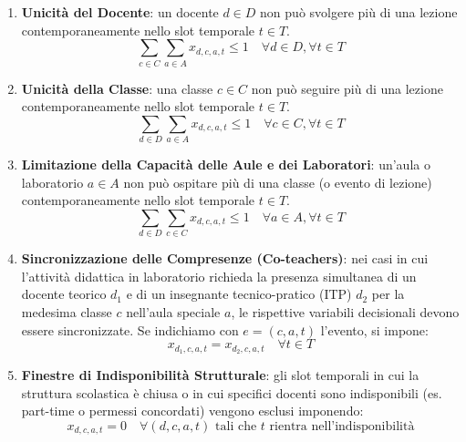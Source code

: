 \begin{enumerate}
    \item \textbf{Unicità del Docente}: un docente $d \in D$ non può svolgere più di una lezione contemporaneamente nello slot temporale $t \in T$.
    \begin{equation}
    \sum_{c \in C} \sum_{a \in A} x_{d,c,a,t} \le 1 \quad \forall d \in D, \forall t \in T
    \label{eq:unicita-docente}
    \end{equation}

    \item \textbf{Unicità della Classe}: una classe $c \in C$ non può seguire più di una lezione contemporaneamente nello slot temporale $t \in T$.
    \begin{equation}
    \sum_{d \in D} \sum_{a \in A} x_{d,c,a,t} \le 1 \quad \forall c \in C, \forall t \in T
    \label{eq:unicita-classe}
    \end{equation}

    \item \textbf{Limitazione della Capacità delle Aule e dei Laboratori}: un'aula o laboratorio $a \in A$ non può ospitare più di una classe (o evento di lezione) contemporaneamente nello slot temporale $t \in T$.
    \begin{equation}
    \sum_{d \in D} \sum_{c \in C} x_{d,c,a,t} \le 1 \quad \forall a \in A, \forall t \in T
    \label{eq:capacita-aule}
    \end{equation}

    \item \textbf{Sincronizzazione delle Compresenze (Co-teachers)}: nei casi in cui l'attività didattica in laboratorio richieda la presenza simultanea di un docente teorico $d_1$ e di un insegnante tecnico-pratico (ITP) $d_2$ per la medesima classe $c$ nell'aula speciale $a$, le rispettive variabili decisionali devono essere sincronizzate. Se indichiamo con $e = (c, a, t)$ l'evento, si impone:
    \begin{equation}
    x_{d_1,c,a,t} = x_{d_2,c,a,t} \quad \forall t \in T
    \label{eq:compresenze}
    \end{equation}

    \item \textbf{Finestre di Indisponibilità Strutturale}: gli slot temporali in cui la struttura scolastica è chiusa o in cui specifici docenti sono indisponibili (es. part-time o permessi concordati) vengono esclusi imponendo:
    \begin{equation}
    x_{d,c,a,t} = 0 \quad \forall (d,c,a,t) \text{ tali che } t \text{ rientra nell'indisponibilità}
    \label{eq:indisponibilita}
    \end{equation}
\end{enumerate}

